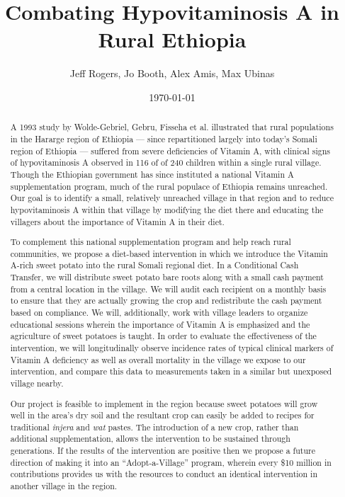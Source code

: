 \documentclass[12pt, letterpaper, draft]{article}
\begin{document}
\title{Combating Hypovitaminosis A in Rural Ethiopia}
\author{Jeff Rogers, Jo Booth, Alex Amis, Max Ubinas}
\date{\today}
\maketitle

\thispagestyle{empty}

\begin{abstract}
A 1993 study by Wolde-Gebriel, Gebru, Fisseha et al. illustrated that rural populations in the Hararge region of Ethiopia --- since repartitioned largely into today's Somali region of Ethiopia --- suffered from severe deficiencies of Vitamin A, with clinical signs of hypovitaminosis A observed in 116 of of 240 children within a single rural village. Though the Ethiopian government has since instituted a national Vitamin A supplementation program, much of the rural populace of Ethiopia remains unreached. Our goal is to identify a small, relatively unreached village in that region and to reduce hypovitaminosis A within that village by modifying the diet there and educating the villagers about the importance of Vitamin A in their diet.

To complement this national supplementation program and help reach rural communities, we propose a diet-based intervention in which we introduce the Vitamin A-rich sweet potato into the rural Somali regional diet. In a Conditional Cash Transfer, we will distribute sweet potato bare roots along with a small cash payment from a central location in the village. We will audit each recipient on a monthly basis to ensure that they are actually growing the crop and redistribute the cash payment based on compliance. We will, additionally, work with village leaders to organize educational sessions wherein the importance of Vitamin A is emphasized and the agriculture of sweet potatoes is taught. In order to evaluate the effectiveness of the intervention, we will longitudinally observe incidence rates of typical clinical markers of Vitamin A deficiency as well as overall mortality in the village we expose to our intervention, and compare this data to measurements taken in a similar but unexposed village nearby. 

Our project is feasible to implement in the region because sweet potatoes will grow well in the area's dry soil and the resultant crop can easily be added to recipes for traditional \emph{injera} and \emph{wat} pastes. The introduction of a new crop, rather than additional supplementation, allows the intervention to be sustained through generations. If the results of the intervention are positive then we propose a future direction of making it into an ``Adopt-a-Village'' program, wherein every \$10 million in contributions provides us with the resources to conduct an identical intervention in another village in the region.
\end{abstract}
\end{document}
